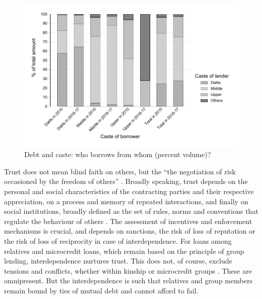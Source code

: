 \documentclass[a4paper, 11pt, onecolumn]{article}
\begin{document}
\begin{figure}[ht!]
\center
\includegraphics[width=12cm]{contengency_borrower_amount_stata.pdf}
\caption{Debt and caste: who borrows from whom (percent volume)?}
\label{cont:volume}
\end{figure}

Trust does not mean blind faith on others, but the ``the negotiation of risk occasioned by the freedom of others'' \citep[p.188]{Hart2000}. 
Broadly speaking, trust depends on the personal and social characteristics of the contracting parties and their respective appreciation, on a process and memory of repeated interactions, and finally on social institutions, broadly defined as the set of rules, norms and conventions that regulate the behaviour of others \citep{Platteau1994}. 
The assessment of incentives and enforcement mechanisms is crucial, and depends on sanctions, the risk of loss of reputation or the risk of loss of reciprocity in case of interdependence. 
For loans among relatives and microcredit loans, which remain based on the principle of group lending, interdependence nurtures trust. 
This does not, of course, exclude tensions and conflicts, whether within kinship or microcredit groups \citep{Kar2018}. 
These are omnipresent. 
But the interdependence is such that relatives and group members remain bound by ties of mutual debt and cannot afford to fail. 
\end{document}
